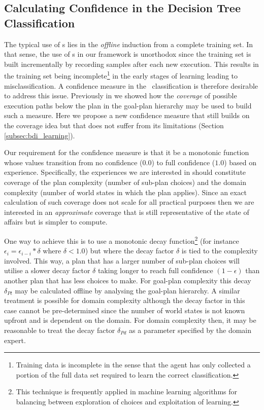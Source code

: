 \subsection{Calculating Confidence in the Decision Tree Classification}

The typical use of \dt s lies in the \textit{offline} induction from a complete training set. In that sense, the use of \dt s in our framework is unorthodox since the training set is built incrementally by recording samples after each new execution. This results in the training set being incomplete\footnote{Training data is incomplete in the sense that the agent has only collected a portion of the full data set required to learn the correct classification.} in the early stages of learning leading to misclassification. A confidence measure in the \dt\ classification is therefore desirable to address this issue. Previously in \cite{Singh:AAMAS10} we showed how the \textit{coverage} of possible execution paths below the plan in the goal-plan hierarchy may be used to build such a measure. Here we propose a new confidence measure that still builds on the coverage idea but that does not suffer from its limitations (Section \ref{subsec:bdi_learning}).

Our requirement for the confidence measure is that it be a monotonic function whose values transition from no confidence ($0.0$) to full confidence ($1.0$) based on experience. Specifically, the experiences we are interested in should constitute coverage of the plan complexity (number of sub-plan choices) and the domain complexity (number of world states in which the plan applies). Since an exact calculation of such coverage does not scale for all practical purposes then we are interested in an \textit{approximate} coverage that is still representative of the state of affairs but is simpler to compute.

One way to achieve this is to use a monotonic decay function\footnote{This technique is frequently applied in machine learning algorithms for balancing between exploration of choices and exploitation of learning.} (for instance $\epsilon_i = \epsilon_{i-i} * \delta$ where $\delta < 1.0$) but where the decay factor $\delta$ is tied to the complexity involved. This way, a plan that has a larger number of sub-plan choices will utilise a slower decay factor $\delta$ taking longer to reach full confidence $(1-\epsilon)$ than another plan that has less choices to make. For goal-plan complexity this decay $\delta_{Pt}$ may be calculated offline by analysing the goal-plan hierarchy. A similar treatment is possible for domain complexity although the decay factor in this case cannot be pre-determined since the number of world states is not known upfront and is dependent on the domain. For domain complexity then, it may be reasonable to treat the decay factor $\delta_{Pd}$ as a parameter specified by the domain expert.

